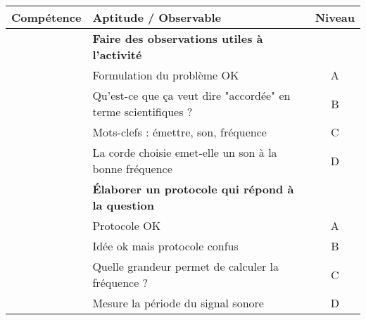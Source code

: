 \documentclass[12pt,a4paper]{article}
\begin{document}
\begin{center}
\begin{tabular}{l|l|c}
\textbf{Compétence} & \textbf{Aptitude} / Observable & \textbf{Niveau} \\
\hline \hline
\app		 	& \textbf{Faire des observations utiles à l'activité} 	& \\
				& Formulation du problème OK													& A \\
				& 	Qu'est-ce que ça veut dire "accordée" en terme scientifiques ?	& B \\
				& Mots-clefs : émettre, son, fréquence										& C \\
				& La corde choisie emet-elle un son à la bonne fréquence	& D \\
\hline
\anarai 	& \textbf{Élaborer un protocole qui répond à la question} 	& \\
				& Protocole OK																				& A \\
				& 	Idée ok mais protocole confus												& B \\
				& Quelle grandeur permet de calculer la fréquence ?			& C \\
				& Mesure la période du signal sonore										& D \\
\end{tabular}
\end{center}
\end{document}
